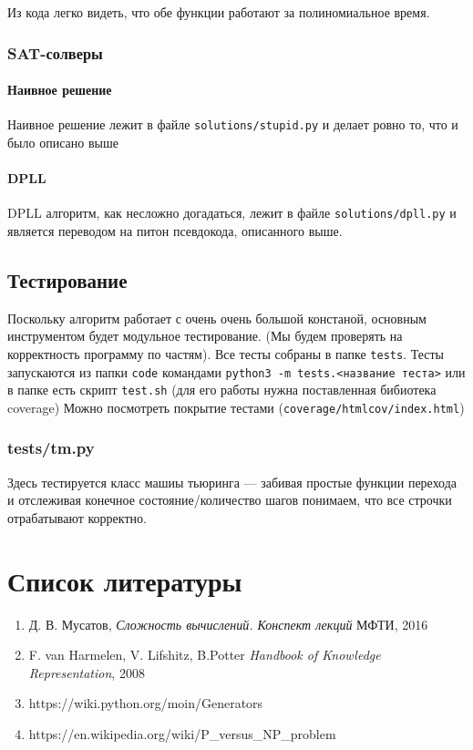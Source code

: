 \documentclass[paper=a4, fontsize=11pt]{scrartcl}
\begin{document}
Из кода легко видеть, что обе функции работают за полиномиальное время.

\subsubsection{SAT-солверы}

\paragraph{Наивное решение}

Наивное решение лежит в файле \texttt{solutions/stupid.py} и делает ровно то,
что и было описано выше

\paragraph{DPLL}

DPLL алгоритм, как несложно догадаться, лежит в файле
\texttt{solutions/dpll.py} и является переводом на питон псевдокода, описанного
выше.

\subsection{Тестирование}

Поскольку алгоритм работает с очень очень большой констаной, основным
инструментом будет модульное тестирование. (Мы будем проверять на корректность
программу по частям). Все тесты собраны в папке \texttt{tests}.
Тесты запускаются из папки \texttt{code} командами
\texttt{python3 -m tests.<название теста>} или в папке 
есть скрипт \texttt{test.sh} (для его работы нужна поставленная бибиотека
coverage)  Можно посмотреть покрытие тестами
(\texttt{coverage/htmlcov/index.html})

\subsubsection{tests/tm.py}

Здесь тестируется класс машиы тьюринга --- забивая простые функции перехода и
отслеживая конечное состояние/количество шагов понимаем, что все строчки
отрабатывают корректно.

\section{Список литературы}

\begin{enumerate}
\item Д. В. Мусатов, \textit{Сложность вычислений. Конспект лекций}
МФТИ, 2016

\item F. van Harmelen, V. Lifshitz, B.Potter
    \textit{Handbook of Knowledge Representation}, 2008

\item https://wiki.python.org/moin/Generators

\item https://en.wikipedia.org/wiki/P\_versus\_NP\_problem

\end{enumerate}
\end{document}
